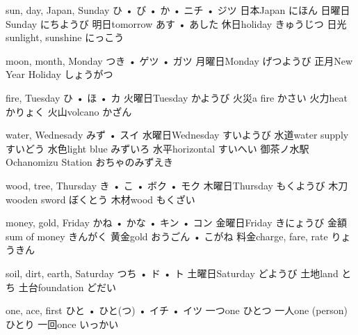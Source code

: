 



\setcounter{cardnum}{1}

		{sun, day, Japan, Sunday}
		{ひ • び • か • ニチ • ジツ}
		{日本}{Japan にほん}
		{日曜日}{Sunday にちようび}
		{明日}{tomorrow あす • あした}
		{休日}{holiday きゅうじつ}
		{日光}{sunlight, sunshine にっこう}

		{moon, month, Monday}
		{つき • ゲツ • ガツ}
		{月曜日}{Monday げつようび}
		{正月}{New Year Holiday しょうがつ}
		{}{}
		{}{}
		{}{}

		{fire, Tuesday}
		{ひ • ほ • カ}
		{火曜日}{Tuesday かようび}
		{火災}{a fire かさい}
		{火力}{heat かりょく}
		{火山}{volcano かざん}
		{}{}

		{water, Wednesady}
		{みず • スイ}
		{水曜日}{Wednesday すいようび}
		{水道}{water supply すいどう}
		{水色}{light blue みずいろ}
		{水平}{horizontal すいへい}
		{御茶ノ水駅}{Ochanomizu Station おちゃのみずえき}

		{wood, tree, Thursday}
		{き • こ • ボク • モク}
		{木曜日}{Thursday もくようび}
		{木刀}{wooden sword ぼくとう}
		{木材}{wood もくざい}
		{}{}
		{}{}

		{money, gold, Friday}
		{かね • かな • キン • コン}
		{金曜日}{Friday きにょうび}
		{金額}{sum of money きんがく}
		{黄金}{gold おうごん • こがね}
		{料金}{charge, fare, rate りょうきん}
		{}{}

		{soil, dirt, earth, Saturday}
		{つち • ド • ト}
		{土曜日}{Saturday どようび}
		{土地}{land とち}
		{土台}{foundation どだい}
		{}{}
		{}{}

		{one, ace, first}
		{ひと • ひと(つ) • イチ • イツ}
		{一つ}{one ひとつ}
		{一人}{one (person) ひとり}
		{一回}{once いっかい}
		{}{}
		{}{}

